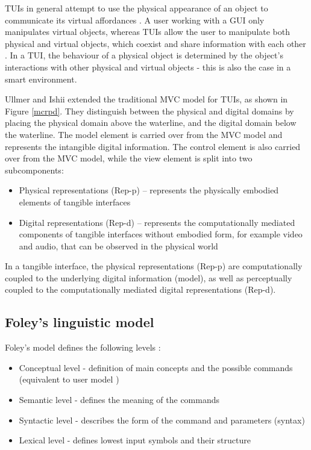 \acp{TUI} in general attempt to use the physical appearance of an object to communicate its virtual affordances \cite{Bellotti2002}. A user working with a \ac{GUI} only manipulates virtual objects, whereas \acp{TUI} allow the user to manipulate both physical and virtual objects, which coexist and share information with each other \cite{Shaer2004}. In a \ac{TUI}, the behaviour of a physical object is determined by the object's interactions with other physical and virtual objects - this is also the case in a smart environment.

Ullmer and Ishii \cite{Ullmer2000} extended the traditional \ac{MVC} model for \acp{TUI}, as shown in Figure \ref{mcrpd}. They distinguish between the physical and digital domains by placing the physical domain above the waterline, and the digital domain below the waterline. The model element is carried over from the \ac{MVC} model and represents the intangible digital information. The control element is also carried over from the \ac{MVC} model, while the view element is split into two subcomponents: 

\begin{itemize}
	\item Physical representations (Rep-p) -- represents the physically embodied elements of tangible interfaces
	\item Digital representations (Rep-d) -- represents the computationally mediated components of tangible interfaces without embodied form, for example video and audio, that can be observed in the physical world  
\end{itemize}


In a tangible interface, the physical representations (Rep-p) are computationally coupled to the underlying digital information (model), as well as perceptually coupled to the computationally mediated digital representations (Rep-d). 


	
	
\subsection{Foley's linguistic model}

	Foley's model defines the following levels \cite{DeRuiter1988}:
	
	\begin{itemize}
		\item Conceptual level - definition of main concepts and the possible commands (equivalent to user model \cite{Buxton1983})
		\item Semantic level - defines the meaning of the commands
		\item Syntactic level - describes the form of the command and parameters (syntax)
		\item Lexical level - defines lowest input symbols and their structure
	\end{itemize}
	
